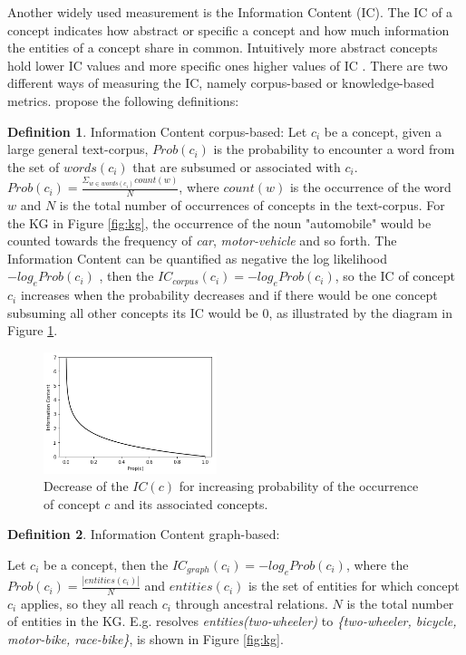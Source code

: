 \documentclass[pdftex,a4paper,12pt]{scrartcl}
\theoremstyle{definition}
\newtheorem{definition}{Definition}[section]
\begin{document}
Another widely used measurement is the Information Content (IC). The IC of a concept indicates how abstract or specific a concept and how much information the entities of a concept share in common. Intuitively more abstract concepts hold lower IC values and more specific ones higher values of IC \citep{resnik_using_1995}. There are two different ways of measuring the IC, namely corpus-based or knowledge-based metrics. \citet{zhu_computing_2017} propose the following definitions: 

\begin{definition}{Information Content corpus-based:}
Let $c_i$ be a concept, given a large general text-corpus, $Prob(c_i)$ is the probability to encounter a word from the set of $words(c_i)$ that are subsumed or associated with $c_i$. $Prob(c_i)= \frac{\Sigma_{w\in words(c_i)} count(w)}{N}$, where $count(w)$ is the occurrence of the word $w$ and $N$ is the total number of occurrences of concepts in the text-corpus. For the KG in Figure \ref{fig:kg}, the occurrence of the noun "automobile" would be counted towards the frequency of \textit{car}, \textit{motor-vehicle} and so forth. The Information Content can be quantified as negative the log likelihood $-log_e Prob(c_i)$ \citep{resnik_using_1995}, then the $IC_{corpus}(c_i) = -log_e Prob(c_i)$, so the IC of concept $c_i$ increases when the probability decreases and if there would be one concept subsuming all other concepts its IC would be $0$, as illustrated by the diagram in Figure \ref{fig:ic-plot}.
\end{definition}

\begin{figure}
    \centering
    \includegraphics[width=0.45\textwidth]{pics/ic-plot.png}
    \caption{Decrease of the $IC(c)$ for increasing probability of the occurrence of concept $c$ and its associated concepts.}
    \label{fig:ic-plot}
\end{figure}


\begin{definition}{Information Content graph-based:}

Let $c_i$ be a concept, then the $IC_{graph}(c_i) = -log_e Prob(c_i)$, where the $Prob(c_i) = \frac{|entities(c_i)|}{N}$ and $entities(c_i)$ is the set of entities for which concept $c_i$ applies, so they all reach $c_i$ through ancestral relations. $N$ is the total number of entities in the KG. E.g. resolves \textit{entities(two-wheeler)} to \textit{\{two-wheeler, bicycle, motor-bike, race-bike\}}, is shown in Figure \ref{fig:kg}. 
\end{definition}
\end{document}

